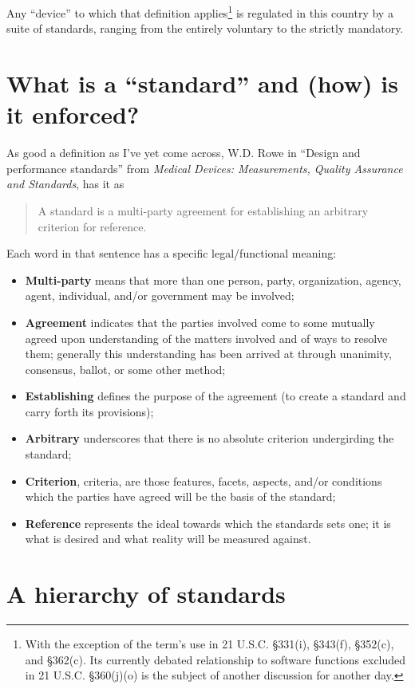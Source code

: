 \documentclass[11pt]{book}
\begin{document}
Any ``device'' to which that definition applies\footnote{With the exception of the term's use in 21 U.S.C. \S331(i), \S343(f), \S352(c), and \S362(c). Its currently debated relationship to software functions excluded in 21 U.S.C. \S 360(j)(o) is the subject of another discussion for another day.} is regulated in this country by a suite of standards, ranging from the entirely voluntary to the strictly mandatory.

\section{What is a ``standard'' and (how) is it enforced?}
As good a definition as I've yet come across, W.D. Rowe in ``Design and performance standards'' from \textit{Medical Devices: Measurements, Quality Assurance and Standards}, has it as

\begin{quote}
	A standard is a multi-party agreement for establishing an arbitrary criterion for reference.
\end{quote}
Each word in that sentence has a specific legal/functional meaning:
\begin{itemize}
	\item \textbf{Multi-party} means that more than one person, party, organization, agency, agent, individual, and/or government may be involved;
	\item \textbf{Agreement} indicates that the parties involved come to some mutually agreed upon understanding of the matters involved and of ways to resolve them; generally this understanding has been arrived at through unanimity, consensus, ballot, or some other method;
	\item \textbf{Establishing} defines the purpose of the agreement (to create a standard and carry forth its provisions);
	\item \textbf{Arbitrary} underscores that there is no absolute criterion undergirding the standard;
	\item \textbf{Criterion}, criteria, are those features, facets, aspects, and/or conditions which the parties have agreed will be the basis of the standard;
	\item \textbf{Reference} represents the ideal towards which the standards sets one; it is what is desired and what reality will be measured against.
\end{itemize}


\section{A hierarchy of standards}
\end{document}
